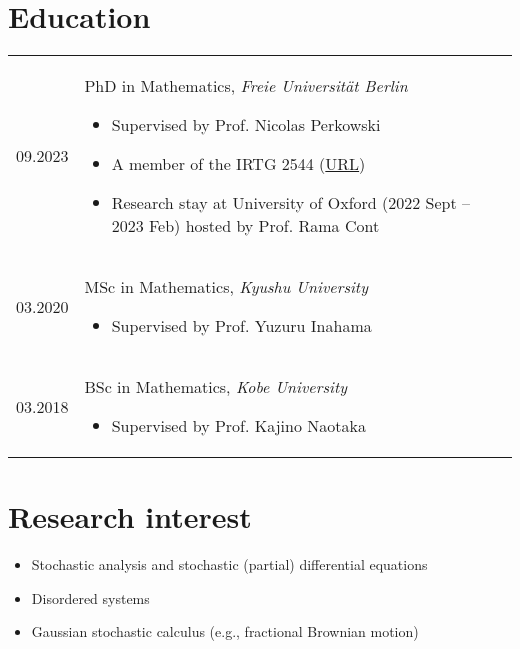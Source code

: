 \documentclass[12pt]{article}
\begin{document}
\section{Education}
\begin{tabular}{p{2.5cm} l}
    \rule{0pt}{0ex} 
    09.2023 & 
    \begin{minipage}[t]{0.8\textwidth}
    PhD in Mathematics, \emph{Freie Universität Berlin} 
    \begin{itemize}[leftmargin=*]
        \renewcommand\labelitemi{--}
        \setlength\itemsep{1ex}
        \setlength{\parskip}{0pt}
        \setlength{\parsep}{0pt}
        \setlength{\baselineskip}{0pt}
        \item  Supervised by Prof. Nicolas Perkowski
        \item  A member of the IRTG 2544 (\href{https://www3.math.tu-berlin.de/stoch/IRTG/}{URL})
        \item Research stay at University of Oxford (2022 Sept -- 2023 Feb) hosted by Prof. Rama Cont
    \end{itemize}
    \end{minipage}
    \\
    \rule{0pt}{4ex} 
    03.2020 & 
    \begin{minipage}[t]{0.8\textwidth}
    MSc in Mathematics, \emph{Kyushu University} 
    \begin{itemize}[leftmargin=*]
        \renewcommand\labelitemi{--}
        \setlength\itemsep{1ex}
        \setlength{\parskip}{0pt}
        \setlength{\parsep}{0pt}
        \setlength{\baselineskip}{0pt}
        \item  Supervised by Prof. Yuzuru Inahama 
    \end{itemize}
    \end{minipage}
    \\
    \rule{0pt}{4ex} 
    03.2018 & 
    \begin{minipage}[t]{0.8\textwidth}
    BSc in Mathematics, \emph{Kobe University} 
    \begin{itemize}[leftmargin=*]
        \renewcommand\labelitemi{--}
        \setlength\itemsep{1ex}
        \setlength{\parskip}{0pt}
        \setlength{\parsep}{0pt}
        \setlength{\baselineskip}{0pt}
        \item  Supervised by Prof. Kajino Naotaka 
    \end{itemize}
    \end{minipage}
\end{tabular}

\section{Research interest}
\begin{itemize}
    \item Stochastic analysis and stochastic (partial) differential equations
    \item Disordered systems
    \item Gaussian stochastic calculus (e.g., fractional Brownian motion)
\end{itemize}
\end{document}
